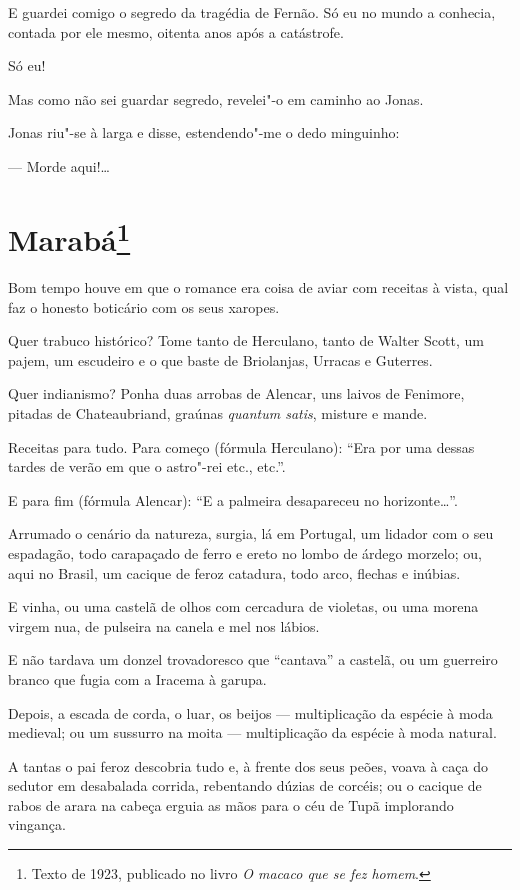 E guardei comigo o segredo da tragédia de Fernão. Só eu no mundo a
conhecia, contada por ele mesmo, oitenta anos após a catástrofe.

Só eu!

Mas como não sei guardar segredo, revelei"-o em caminho ao Jonas.

Jonas riu"-se à larga e disse, estendendo"-me o dedo minguinho:

--- Morde aqui!\ldots{}

\chapter{Marabá\footnote[*]{Texto de 1923, publicado no livro \emph{O macaco que se fez homem}.}}

Bom tempo houve em que o romance era coisa de aviar com receitas à
vista, qual faz o honesto boticário com os seus xaropes.

Quer trabuco histórico? Tome tanto de Herculano, tanto de Walter Scott,
um pajem, um escudeiro e o que baste de Briolanjas, Urracas e Guterres.

Quer indianismo? Ponha duas arrobas de Alencar, uns laivos de Fenimore,
pitadas de Chateaubriand, graúnas \emph{quantum satis}, misture e mande.

Receitas para tudo. Para começo (fórmula Herculano): ``Era por uma
dessas tardes de verão em que o astro"-rei etc., etc.''.

E para fim (fórmula Alencar): ``E a palmeira desapareceu no
horizonte\ldots{}''.

Arrumado o cenário da natureza, surgia, lá em Portugal, um lidador com o
seu espadagão, todo carapaçado de ferro e ereto no lombo de árdego
morzelo; ou, aqui no Brasil, um cacique de feroz catadura, todo arco,
flechas e inúbias.

E vinha, ou uma castelã de olhos com cercadura de violetas, ou uma
morena virgem nua, de pulseira na canela e mel nos lábios.

E não tardava um donzel trovadoresco que ``cantava'' a castelã, ou um
guerreiro branco que fugia com a Iracema à garupa.

Depois, a escada de corda, o luar, os beijos --- multiplicação da
espécie à moda medieval; ou um sussurro na moita --- multiplicação da
espécie à moda natural.

A tantas o pai feroz descobria tudo e, à frente dos seus peões, voava à
caça do sedutor em desabalada corrida, rebentando dúzias de corcéis; ou
o cacique de rabos de arara na cabeça erguia as mãos para o céu de Tupã
implorando vingança.

